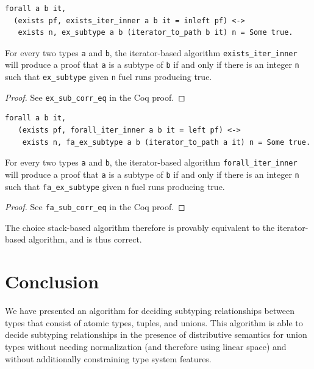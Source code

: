 \documentclass[a4paper,english]{lipics-v2019}
\begin{document}
\begin{lemma}
\begin{small}\begin{verbatim}
forall a b it, 
  (exists pf, exists_iter_inner a b it = inleft pf) <->
   exists n, ex_subtype a b (iterator_to_path b it) n = Some true.
\end{verbatim}\end{small}
For every two types \verb|a| and \verb|b|, the iterator-based algorithm
\verb|exists_iter_inner| will produce a proof that \verb|a| is a subtype
of \verb|b| if and only if there is an integer \verb|n| such that
 \verb|ex_subtype| given \verb|n| fuel runs producing true.
\end{lemma}
\begin{proof}
See \verb|ex_sub_corr_eq| in the Coq proof.
\end{proof}

\begin{lemma}
\begin{small}\begin{verbatim}
forall a b it,
   (exists pf, forall_iter_inner a b it = left pf) <->
    exists n, fa_ex_subtype a b (iterator_to_path a it) n = Some true.
\end{verbatim}
\end{small}  
For every two types \verb|a| and \verb|b|, the iterator-based algorithm
\verb|forall_iter_inner| will produce a proof that \verb|a| is a subtype
of \verb|b| if and only if there is an integer \verb|n| such that
 \verb|fa_ex_subtype| given \verb|n| fuel runs producing true.
\end{lemma}
\begin{proof}
See \verb|fa_sub_corr_eq| in the Coq proof.
\end{proof}

The choice stack-based algorithm therefore is provably equivalent to the
iterator-based algorithm, and is thus correct.

\section{Conclusion}

We have presented an algorithm for deciding subtyping relationships between
types that consist of atomic types, tuples, and unions. This algorithm is able
to decide subtyping relationships in the presence of distributive semantics
for union types without needing normalization (and therefore using linear
space) and without additionally constraining type system features.

%

\end{document}

